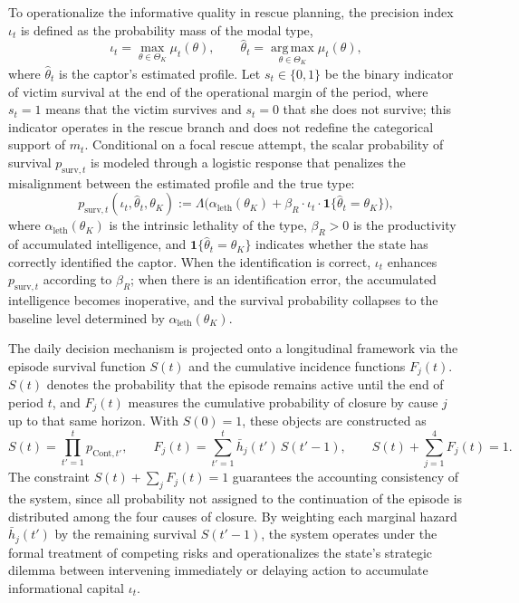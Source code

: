 \documentclass[review,authoryear,12pt]{elsarticle}
\theoremstyle{plain}
\theoremstyle{definition}
\newcommand{\ThetaK}{\Theta_K}
\newcommand{\1}{\mathbf{1}}
\begin{document}
To operationalize the informative quality in rescue planning, the precision index $\iota_t$ is defined as the probability mass of the modal type,
\begin{equation}
\iota_t=\max_{\theta\in\ThetaK}\mu_t(\theta),\qquad\hat{\theta}_t=\operatorname*{arg\,max}_{\theta\in\ThetaK}\mu_t(\theta),
\label{eq:iota}
\end{equation}
where $\hat{\theta}_t$ is the captor's estimated profile. Let $s_t\in\{0,1\}$ be the binary indicator of victim survival at the end of the operational margin of the period, where $s_t=1$ means that the victim survives and $s_t=0$ that she does not survive; this indicator operates in the rescue branch and does not redefine the categorical support of $m_t$. Conditional on a focal rescue attempt, the scalar probability of survival $p_{\mathrm{surv},t}$ is modeled through a logistic response that penalizes the misalignment between the estimated profile and the true type:
\begin{equation}
p_{\mathrm{surv},t}(\iota_t,\hat{\theta}_t,\theta_K):=\Lambda\bigl(\alpha_{\mathrm{leth}}(\theta_K)+\beta_R\cdot\iota_t\cdot\mathbf{1}\{\hat{\theta}_t=\theta_K\}\bigr),
\label{eq:p-surv}
\end{equation}
where $\alpha_{\mathrm{leth}}(\theta_K)$ is the intrinsic lethality of the type, $\beta_R>0$ is the productivity of accumulated intelligence, and $\mathbf{1}\{\hat{\theta}_t=\theta_K\}$ indicates whether the state has correctly identified the captor. When the identification is correct, $\iota_t$ enhances $p_{\mathrm{surv},t}$ according to $\beta_R$; when there is an identification error, the accumulated intelligence becomes inoperative, and the survival probability collapses to the baseline level determined by $\alpha_{\mathrm{leth}}(\theta_K)$.

The daily decision mechanism is projected onto a longitudinal framework via the episode survival function $S(t)$ and the cumulative incidence functions $F_j(t)$. $S(t)$ denotes the probability that the episode remains active until the end of period $t$, and $F_j(t)$ measures the cumulative probability of closure by cause $j$ up to that same horizon. With $S(0)=1$, these objects are constructed as
\begin{equation}
S(t)=\prod_{t'=1}^{t}p_{\mathrm{Cont},t'},\qquad F_j(t)=\sum_{t'=1}^{t}\bar h_j(t')\,S(t'-1),\qquad S(t)+\sum_{j=1}^{4}F_j(t)=1.
\label{eq:longitudinal}
\end{equation}
The constraint $S(t)+\sum_j F_j(t)=1$ guarantees the accounting consistency of the system, since all probability not assigned to the continuation of the episode is distributed among the four causes of closure. By weighting each marginal hazard $\bar h_j(t')$ by the remaining survival $S(t'-1)$, the system operates under the formal treatment of competing risks and operationalizes the state's strategic dilemma between intervening immediately or delaying action to accumulate informational capital $\iota_t$.
\end{document}
